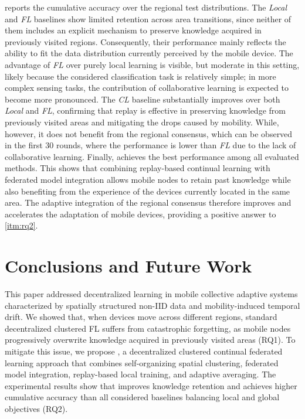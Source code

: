 \documentclass[conference]{IEEEtran}
\theoremstyle{plain}
\theoremstyle{definition}
\begin{document}
 reports the cumulative accuracy 
 over the regional test distributions. 
%
The \emph{Local} and \emph{FL} baselines show limited retention across area transitions, 
 since neither of them includes an explicit mechanism to preserve knowledge acquired 
 in previously visited regions. 
% 
Consequently, 
 their performance mainly reflects the ability to fit the data distribution currently perceived 
 by the mobile device. 
% 
The advantage of \emph{FL} over purely local learning is visible,
 but moderate in this setting, 
 likely because the considered classification task is relatively simple; 
 in more complex sensing tasks, 
 the contribution of collaborative learning is expected to become more pronounced.
%
The \emph{CL} baseline substantially improves over both \emph{Local} and \emph{FL}, 
 confirming that replay is effective in preserving knowledge from previously visited areas 
 and mitigating the drops caused by mobility.
While, however, it does not benefit from the regional consensus, which can be observed in the first 30 rounds, 
 where the performance is lower than \emph{FL} due to the lack of collaborative learning.
% 
Finally, 
 \approach{} achieves the best performance among all evaluated methods.
% 
This shows that combining replay-based continual learning with federated model integration 
 allows mobile nodes to retain past knowledge while also benefiting from the experience 
 of the devices currently located in the same area. 
%
The adaptive integration of the regional consensus therefore improves 
 and accelerates the adaptation of mobile devices, 
 providing a positive answer to \ref{itm:rq2}.

\section{Conclusions and Future Work}\label{sec:conclusion}

This paper addressed decentralized learning 
 in mobile collective adaptive systems characterized by 
 spatially structured non-IID data 
 and mobility-induced temporal drift. 
% 
We showed that, 
 when devices move across different regions, 
 standard decentralized clustered FL suffers from catastrophic forgetting, 
 as mobile nodes progressively overwrite knowledge acquired in previously visited areas (RQ1). 
% 
To mitigate this issue, 
 we propose \approach{}, 
 a decentralized clustered continual federated learning approach 
 that combines self-organizing spatial clustering, federated model integration, 
 replay-based local training, 
 and adaptive averaging. 
% 
The experimental results show that \approach{} 
 improves knowledge retention and achieves higher cumulative accuracy 
 than all considered baselines balancing local and global objectives (RQ2).
\end{document}
